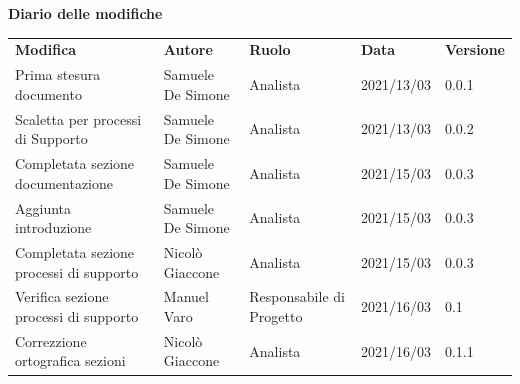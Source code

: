 \documentclass[a4paper]{article}
\begin{document}
\begin{center}

    \textbf{\Large Diario delle modifiche}\\
    \vspace{10px}
    \begin{table}[h!]
        \centering
        \renewcommand{\arraystretch}{1.8}
        \begin{tabular}{p{150px} p{90px} p{65px} p{60px} p{45px}}
            \rowcolor{logo!70} \textbf{Modifica}             & \textbf{Autore}   & \textbf{Ruolo}                    & \textbf{Data} & \textbf{Versione} \\
            Prima stesura documento                          & Samuele De Simone & Analista                          & 2021/13/03    & 0.0.1             \\
            Scaletta per processi di Supporto                & Samuele De Simone & Analista                          & 2021/13/03    & 0.0.2             \\
            Completata sezione \newline documentazione       & Samuele De Simone & Analista                          & 2021/15/03    & 0.0.3             \\
            Aggiunta introduzione                            & Samuele De Simone & Analista                          & 2021/15/03    & 0.0.3             \\
            Completata sezione processi \newline di supporto & Nicolò Giaccone   & Analista                          & 2021/15/03    & 0.0.3             \\
            Verifica sezione processi \newline di supporto   & Manuel Varo       & Responsabile \newline di Progetto & 2021/16/03    & 0.1               \\
            Correzzione ortografica sezioni                  & Nicolò Giaccone   & Analista                          & 2021/16/03    & 0.1.1             \\
        \end{tabular}
    \end{table}
\end{center}
\newpage
\tableofcontents
\newpage




\end{document}
